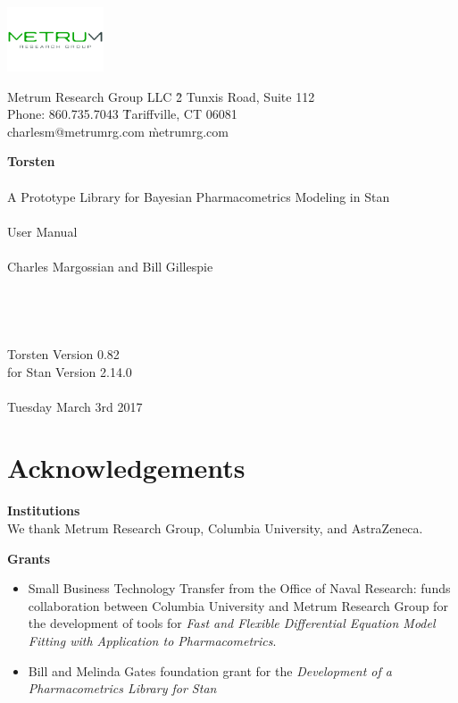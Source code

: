 \documentclass[11pt]{amsart}
\let\oldsection\section
\renewcommand\section{\clearpage\oldsection}
\begin{document}
\begin{center}
\includegraphics[height=0.75in]{graphics/logo.pdf}\\
\textcolor{MRGGreen}{\sf
\begin{tabbing}
Metrum Research Group LLC \` 2 Tunxis Road, Suite 112 \\
Phone: 860.735.7043 \` Tariffville, CT 06081 \\
charlesm@metrumrg.com \` metrumrg.com \\
\end{tabbing}
}
{\Huge \textbf{Torsten} \\ \ \\  \huge A Prototype Library for Bayesian Pharmacometrics Modeling in Stan \\ \ \\
User Manual \\ \ \\ 
\Large Charles Margossian and Bill Gillespie \\ \ \\ \ \\ \ \\ \ \\
Torsten Version 0.82 \\ for Stan Version 2.14.0 \\ \ \\ 
\large Tuesday March 3rd 2017 }
\end{center}

\clearpage

\tableofcontents

\section*{Acknowledgements}

{\bf Institutions} \ \\
We thank Metrum Research Group, Columbia University, and AstraZeneca.

{\bf Grants}
\begin{itemize}
  \item Small Business Technology Transfer from the Office of Naval Research: funds collaboration between Columbia University and Metrum Research Group for the development of tools for \textit{Fast and Flexible Differential Equation Model Fitting with Application to Pharmacometrics}.
  \item  Bill and Melinda Gates foundation grant for the \textit{Development of a Pharmacometrics Library for Stan}
\end{itemize}
\end{document}
